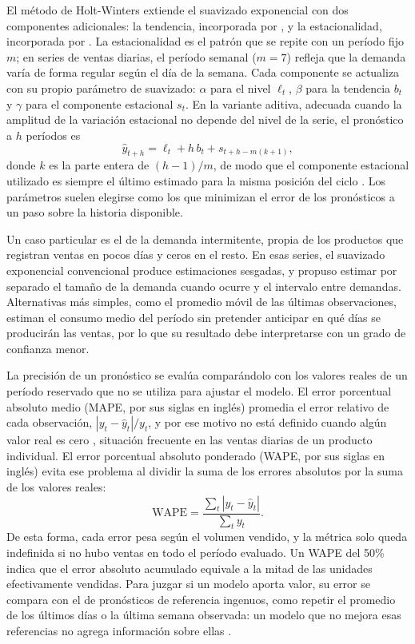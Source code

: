 El método de Holt-Winters extiende el suavizado exponencial con dos componentes adicionales: la tendencia, incorporada por \textcite{Holt2004}, y la estacionalidad, incorporada por \textcite{Winters1960}. La estacionalidad es el patrón que se repite con un período fijo $m$; en series de ventas diarias, el período semanal ($m = 7$) refleja que la demanda varía de forma regular según el día de la semana. Cada componente se actualiza con su propio parámetro de suavizado: $\alpha$ para el nivel $\ell_t$, $\beta$ para la tendencia $b_t$ y $\gamma$ para el componente estacional $s_t$. En la variante aditiva, adecuada cuando la amplitud de la variación estacional no depende del nivel de la serie, el pronóstico a $h$ períodos es
\[
\hat{y}_{t+h} = \ell_t + h\,b_t + s_{t+h-m(k+1)},
\]
donde $k$ es la parte entera de $(h-1)/m$, de modo que el componente estacional utilizado es siempre el último estimado para la misma posición del ciclo \parencite{Hyndman2021}. Los parámetros suelen elegirse como los que minimizan el error de los pronósticos a un paso sobre la historia disponible.

Un caso particular es el de la demanda intermitente, propia de los productos que registran ventas en pocos días y ceros en el resto. En esas series, el suavizado exponencial convencional produce estimaciones sesgadas, y \textcite{Croston1972} propuso estimar por separado el tamaño de la demanda cuando ocurre y el intervalo entre demandas. Alternativas más simples, como el promedio móvil de las últimas observaciones, estiman el consumo medio del período sin pretender anticipar en qué días se producirán las ventas, por lo que su resultado debe interpretarse con un grado de confianza menor.

La precisión de un pronóstico se evalúa comparándolo con los valores reales de un período reservado que no se utiliza para ajustar el modelo. El error porcentual absoluto medio (MAPE, por sus siglas en inglés) promedia el error relativo de cada observación, $|y_t - \hat{y}_t| / y_t$, y por ese motivo no está definido cuando algún valor real es cero \parencite{Hyndman2006}, situación frecuente en las ventas diarias de un producto individual. El error porcentual absoluto ponderado (WAPE, por sus siglas en inglés) evita ese problema al dividir la suma de los errores absolutos por la suma de los valores reales:
\[
\text{WAPE} = \frac{\sum_t |y_t - \hat{y}_t|}{\sum_t y_t}.
\]
De esta forma, cada error pesa según el volumen vendido, y la métrica solo queda indefinida si no hubo ventas en todo el período evaluado. Un WAPE del 50\% indica que el error absoluto acumulado equivale a la mitad de las unidades efectivamente vendidas. Para juzgar si un modelo aporta valor, su error se compara con el de pronósticos de referencia ingenuos, como repetir el promedio de los últimos días o la última semana observada: un modelo que no mejora esas referencias no agrega información sobre ellas \parencite{Hyndman2021}.

